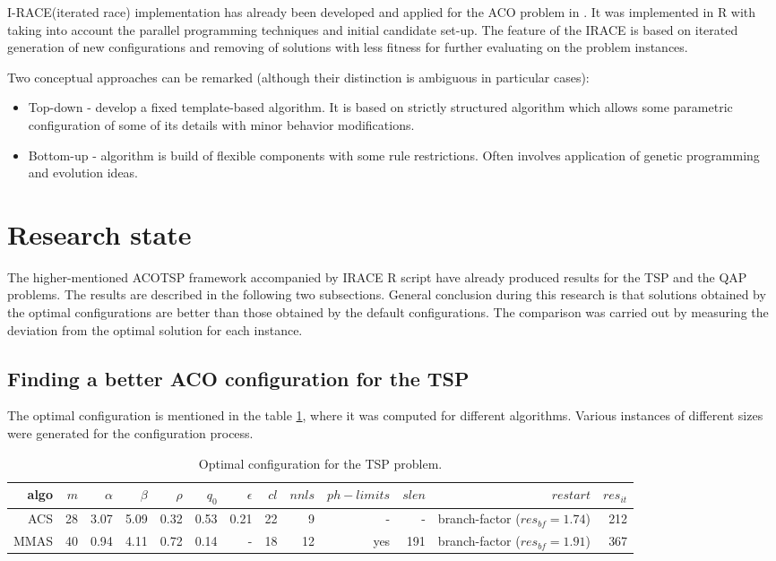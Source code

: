 \documentclass[12pt]{article}
\begin{document}
I-RACE(iterated race) implementation has already been developed and applied for the ACO problem in \cite{iraceaac}. It was implemented in R with taking into account the parallel programming techniques and initial candidate set-up. The feature of the IRACE is based on iterated generation of new configurations and removing of solutions with less fitness for further evaluating on the problem instances.


Two conceptual approaches can be remarked (although their distinction is ambiguous in particular cases):
\begin{itemize}
\item Top-down - develop a fixed template-based algorithm. It is based on strictly structured algorithm which allows some parametric configuration of some of its details with minor behavior modifications.
\item Bottom-up - algorithm is build of flexible components with some rule restrictions. Often involves application of genetic programming and evolution ideas.
\end{itemize}

\section{Research state}

The higher-mentioned ACOTSP framework accompanied by IRACE R script have already produced results for the TSP and the QAP problems. The results are described in the following two subsections. General conclusion during this research is that solutions obtained by the optimal configurations are better than those obtained by the default configurations. The comparison was carried out by measuring the deviation from the optimal solution for each instance.

\subsection{Finding a better ACO configuration for the TSP}

The optimal configuration is mentioned in the table \ref{table:table-tsp}, where it was computed for different algorithms. Various instances of different sizes were generated for the configuration process.

\begin{table}[ht]
\centering
\resizebox{\textwidth}{!}
{
\begin{tabular}{|r|r|r|r|r|r|r|r|r|r|r|r|r|}
  \hline 
    algo & $m$ & $\alpha$ & $\beta$ & $\rho$ & $q_0$ & $\epsilon$ & $cl$ & $nnls$ & $ph-limits$ & $slen$ & $restart$ & $res_{it}$\\ \hline
    ACS & 28 & 3.07 & 5.09 & 0.32 & 0.53 & 0.21 & 22 & 9 & - & - & branch-factor ($res_{bf} = 1.74$) & 212\\ \hline
	MMAS & 40 & 0.94 & 4.11 & 0.72 & 0.14 & - & 18 & 12 & yes & 191 & branch-factor ($res_{bf} = 1.91$) & 367\\ \hline
\end{tabular}
}
\caption{Optimal configuration for the TSP problem.}
\label{table:table-tsp} 
\end{table} 
\end{document}
